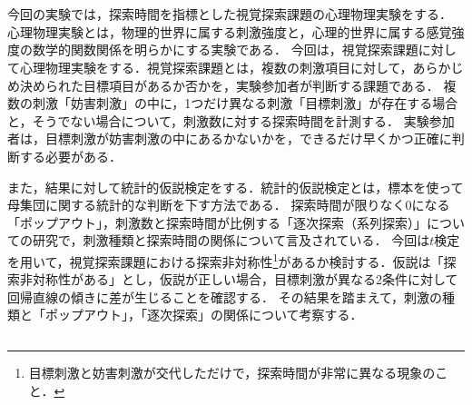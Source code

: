\chapter{\kadaib}
\section{\purpose}
今回の実験では，探索時間を指標とした視覚探索課題の心理物理実験をする．
心理物理実験とは，物理的世界に属する刺激強度と，心理的世界に属する感覚強度の数学的関数関係を明らかにする実験である\cite{心理物理測定法}．
今回は，視覚探索課題に対して心理物理実験をする．視覚探索課題とは，複数の刺激項目に対して，あらかじめ決められた目標項目があるか否かを，実験参加者が判断する課題である\cite{視覚探索}．
複数の刺激「妨害刺激」の中に，1つだけ異なる刺激「目標刺激」が存在する場合と，そうでない場合について，刺激数に対する探索時間を計測する．
実験参加者は，目標刺激が妨害刺激の中にあるかないかを，できるだけ早くかつ正確に判断する必要がある．\par
また，結果に対して統計的仮説検定をする．統計的仮説検定とは，標本を使って母集団に関する統計的な判断を下す方法である\cite[p.200]{Pythonで学ぶあたらしい統計学の教科書}．
探索時間が限りなく\(0\)になる「ポップアウト」，刺激数と探索時間が比例する「逐次探索（系列探索）」についての研究\cite{視覚探索課題と注意に関する研究動向}で，刺激種類と探索時間の関係について言及されている．
今回は\(t\)検定を用いて，視覚探索課題における探索非対称性\footnote{目標刺激と妨害刺激が交代しただけで，探索時間が非常に異なる現象のこと\cite{4視覚探索}．}があるか検討する．仮説は「探索非対称性がある」とし，仮説が正しい場合，目標刺激が異なる2条件に対して回帰直線の傾きに差が生じることを確認する．
その結果を踏まえて，刺激の種類と「ポップアウト」，「逐次探索」の関係について考察する．
\section{\method}
